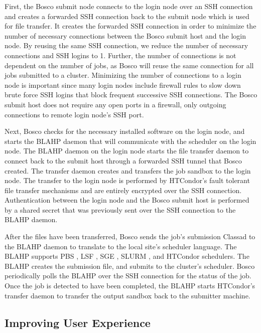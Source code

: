 First, the Bosco submit node connects to the login node over an SSH connection and creates a forwarded SSH connection back to the submit node which is used for file transfer.  It creates the forwarded SSH connection in order to minimize the number of necessary connections between the Bosco submit host and the login node.  By reusing the same SSH connection, we reduce the number of necessary connections and SSH logins to 1.  Further, the number of connections is not dependent on the number of jobs, as Bosco will reuse the same connection for all jobs submitted to a cluster.  Minimizing the number of connections to a login node is important since many login nodes include firewall rules to slow down brute force SSH logins that block frequent successive SSH connections.  The Bosco submit host does not require any open ports in a firewall, only outgoing connections to remote login node's SSH port.

Next, Bosco checks for the necessary installed software on the login node, and starts the BLAHP daemon that will communicate with the scheduler on the login node.  The BLAHP daemon on the login node starts the file transfer daemon to connect back to the submit host through a forwarded SSH tunnel that Bosco created.  The transfer daemon creates and transfers the job sandbox to the login node.  The transfer to the login node is performed by HTCondor's fault tolerant file transfer mechanisms and are entirely encrypted over the SSH connection.  Authentication between the login node and the Bosco submit host is performed by a shared secret that was previously sent over the SSH connection to the BLAHP daemon.

After the files have been transferred, Bosco sends the job's submission Classad \cite{raman1998matchmaking} to the BLAHP daemon to translate to the local site's scheduler language.  The BLAHP supports PBS \cite{computing2013torque}, LSF \cite{computinglsf}, SGE \cite{gentzsch2001sun}, SLURM \cite{yoo2003slurm}, and HTCondor schedulers.  The BLAHP creates the submission file, and submits to the cluster's scheduler.  Bosco periodically polls the BLAHP over the SSH connection for the status of the job.  Once the job is detected to have been completed, the BLAHP starts HTCondor's transfer daemon to transfer the output sandbox back to the submitter machine.

\subsection{Improving User Experience}


